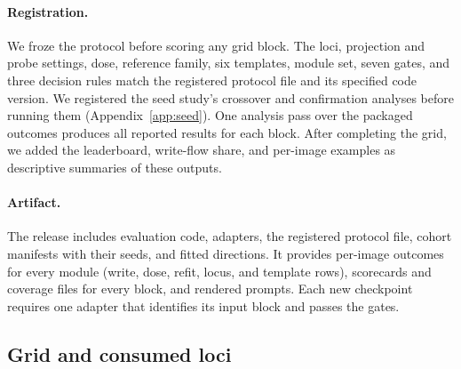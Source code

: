\documentclass{article}
\begin{document}
\paragraph{Registration.} We froze the protocol before scoring any grid block. The loci, projection and probe settings, dose, reference family, six templates, module set, seven gates, and three decision rules match the registered protocol file and its specified code version. We registered the seed study's crossover and confirmation analyses before running them (Appendix~\ref{app:seed}). One analysis pass over the packaged outcomes produces all reported results for each block. After completing the grid, we added the leaderboard, write-flow share, and per-image examples as descriptive summaries of these outputs.

\paragraph{Artifact.} The release includes evaluation code, adapters, the registered protocol file, cohort manifests with their seeds, and fitted directions. It provides per-image outcomes for every module (write, dose, refit, locus, and template rows), scorecards and coverage files for every block, and rendered prompts. Each new checkpoint requires one adapter that identifies its input block and passes the gates.

\subsection{Grid and consumed loci}
\label{app:cf-grid}
\end{document}

